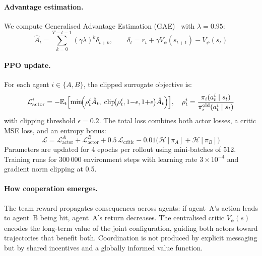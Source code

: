 \documentclass[12pt]{article}
\newcommand{\state}{s}
\newcommand{\action}{a}
\newcommand{\policy}{\pi}
\newcommand{\discount}{\gamma}
\begin{document}
\paragraph{Advantage estimation.}
We compute Generalised Advantage Estimation (GAE)~\citep{schulman2015high}
with $\lambda = 0.95$:
\begin{equation}
  \hat{A}_t = \sum_{k=0}^{T-t-1}(\discount\lambda)^k \delta_{t+k},
  \qquad \delta_t = r_t + \discount V_\psi(\state_{t+1}) - V_\psi(\state_t)
  \label{eq:gae}
\end{equation}

\paragraph{PPO update.}
For each agent $i \in \{A, B\}$, the clipped surrogate objective is:
\begin{equation}
  \mathcal{L}_{\text{actor}}^i = -\mathbb{E}_t\Bigl[
    \min\!\Bigl(
      \rho_t^i \hat{A}_t,\;
      \text{clip}\!\bigl(\rho_t^i, 1{-}\epsilon, 1{+}\epsilon\bigr)\hat{A}_t
    \Bigr)
  \Bigr], \quad
  \rho_t^i = \frac{\policy_i(\action_t^i \mid \state_t)}
                   {\policy_i^{\text{old}}(\action_t^i \mid \state_t)}
  \label{eq:ppo}
\end{equation}
with clipping threshold $\epsilon = 0.2$.  The total loss combines both
actor losses, a critic MSE loss, and an entropy bonus:
\begin{equation}
  \mathcal{L} = \mathcal{L}_{\text{actor}}^A + \mathcal{L}_{\text{actor}}^B
    + 0.5\,\mathcal{L}_{\text{critic}}
    - 0.01\bigl(\mathcal{H}[\policy_A] + \mathcal{H}[\policy_B]\bigr)
  \label{eq:mappo_loss}
\end{equation}
Parameters are updated for 4 epochs per rollout using mini-batches of 512.
Training runs for 300\,000 environment steps with learning rate $3 \times
10^{-4}$ and gradient norm clipping at 0.5.

\paragraph{How cooperation emerges.}
The team reward propagates consequences across agents: if agent~A's action
leads to agent~B being hit, agent~A's return decreases.  The centralised
critic $V_\psi(\state)$ encodes the long-term value of the joint configuration,
guiding both actors toward trajectories that benefit both.  Coordination is
not produced by explicit messaging but by shared incentives and a globally
informed value function.
\end{document}
